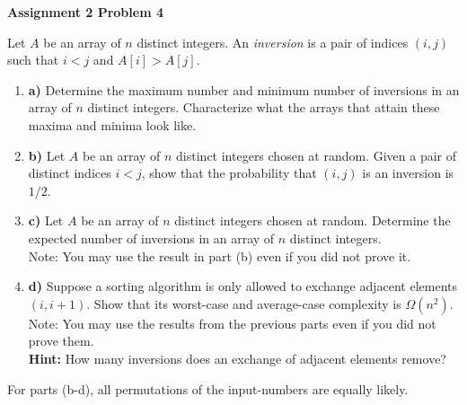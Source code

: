 \documentclass[12pt]{article}
\begin{document}
	
	\begin{center}
		{\Large\bf Assignment 2 Problem 4}\\
		\vspace{3mm}
	\end{center}
	
	\def\question#1{\item[\bf #1.]}
	\def\part#1{\item[\bf #1)]}
	\newcommand{\pc}[1]{\mbox{\textbf{#1}}} %
	
	
	
	Let $A$ be an array of $n$ distinct integers. An {\em inversion} is a pair of indices $(i, j)$ such that $i < j$ and $A[i] > A[j]$.
	\begin{enumerate}
		\part{a} Determine the maximum number and minimum number of inversions in an array of $n$ distinct integers. 
		Characterize what the arrays that attain these maxima and minima look like.
		
		\part{b} Let $A$ be an array of $n$ distinct integers chosen at random.
		Given a pair of distinct indices $i<j$, show that the probability that $(i, j)$ is an inversion is $1/2$. 
		
		\part{c} Let $A$ be an array of $n$ distinct integers chosen at random.
		Determine the expected number of inversions in an array of $n$ distinct integers. \\
		Note: You may use the result in part (b) even if you did not prove it.
		
		\part{d} Suppose a sorting algorithm is only allowed to exchange adjacent elements $(i, i + 1)$.
		Show that its worst-case and average-case complexity is $\Omega(n^2)$. \\
		Note: You may use the results from the previous parts even if you did not prove them. \\
		\textbf{Hint:} How many inversions does an exchange of adjacent elements remove?
		
	\end{enumerate}
	For parts (b-d), all permutations of the input-numbers are equally likely.\\
	
\end{document}

